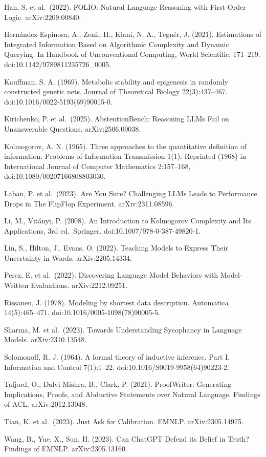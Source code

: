 \documentclass[
  10pt,
]{article}
\begin{document}
Han, S. et al.~(2022). FOLIO: Natural Language Reasoning with
First-Order Logic. arXiv:2209.00840.

Hernández-Espinosa, A., Zenil, H., Kiani, N. A., Tegnér, J. (2021).
Estimations of Integrated Information Based on Algorithmic Complexity
and Dynamic Querying. In Handbook of Unconventional Computing, World
Scientific, 171--219. doi:10.1142/9789811235726\_0005.

Kauffman, S. A. (1969). Metabolic stability and epigenesis in randomly
constructed genetic nets. Journal of Theoretical Biology 22(3):437--467.
doi:10.1016/0022-5193(69)90015-0.

Kirichenko, P. et al.~(2025). AbstentionBench: Reasoning LLMs Fail on
Unanswerable Questions. arXiv:2506.09038.

Kolmogorov, A. N. (1965). Three approaches to the quantitative
definition of information. Problems of Information Transmission 1(1).
Reprinted (1968) in International Journal of Computer Mathematics
2:157--168, doi:10.1080/00207166808803030.

Laban, P. et al.~(2023). Are You Sure? Challenging LLMs Leads to
Performance Drops in The FlipFlop Experiment. arXiv:2311.08596.

Li, M., Vitányi, P. (2008). An Introduction to Kolmogorov Complexity and
Its Applications, 3rd ed.~Springer. doi:10.1007/978-0-387-49820-1.

Lin, S., Hilton, J., Evans, O. (2022). Teaching Models to Express Their
Uncertainty in Words. arXiv:2205.14334.

Perez, E. et al.~(2022). Discovering Language Model Behaviors with
Model-Written Evaluations. arXiv:2212.09251.

Rissanen, J. (1978). Modeling by shortest data description. Automatica
14(5):465--471. doi:10.1016/0005-1098(78)90005-5.

Sharma, M. et al.~(2023). Towards Understanding Sycophancy in Language
Models. arXiv:2310.13548.

Solomonoff, R. J. (1964). A formal theory of inductive inference. Part
I. Information and Control 7(1):1--22.
doi:10.1016/S0019-9958(64)90223-2.

Tafjord, O., Dalvi Mishra, B., Clark, P. (2021). ProofWriter: Generating
Implications, Proofs, and Abductive Statements over Natural Language.
Findings of ACL. arXiv:2012.13048.

Tian, K. et al.~(2023). Just Ask for Calibration. EMNLP.
arXiv:2305.14975.

Wang, B., Yue, X., Sun, H. (2023). Can ChatGPT Defend its Belief in
Truth? Findings of EMNLP. arXiv:2305.13160.
\end{document}
